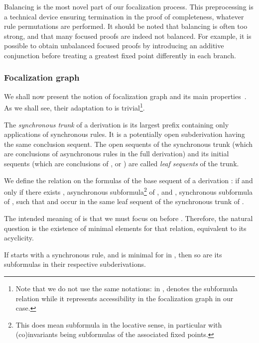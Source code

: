 Balancing is the most novel part of our focalization process.
This preprocessing is a technical device ensuring
termination in the proof of completeness,
whatever rule permutations are performed.
It should be noted that balancing is often too strong,
and that many focused proofs are indeed not balanced.
For example,
it is possible to obtain unbalanced focused proofs
by introducing an additive conjunction before treating a greatest 
fixed point differently in each branch.

\subsubsection{Focalization graph}

We shall now present the notion of focalization graph
and its main properties~\cite{miller07cslb}.
As we shall see, their adaptation to \mumall{}
is trivial\footnote{
  Note that we do not use the same notations:
  in \cite{miller07cslb},  denotes the subformula relation
  while it represents accessibility in the focalization graph in our case.
}.

\begin{definition}
The \emph{synchronous trunk} of a derivation is its largest prefix
containing only applications of synchronous rules.
It is a potentially open subderivation having the same conclusion sequent.
The open sequents of the synchronous trunk (which are conclusions
of asynchronous rules in the full derivation) and its initial sequents
(which are conclusions of ,  or )
are called \emph{leaf sequents} of the trunk.
\end{definition}

\begin{definition}
We define the relation  on the formulas of
the base sequent of a derivation :
 if and only if
there exists , asynchronous subformula\footnote{
  This does mean subformula in the locative sense,
  in particular with (co)invariants being subformulas of
  the associated fixed points.
} of ,
and , synchronous subformula of ,
such that  and  occur in the same
leaf sequent of the synchronous trunk of .
\end{definition}

The intended meaning of  is that we must focus on  before .
Therefore, the natural question is the existence of minimal elements for that 
relation, equivalent to its acyclicity.

\begin{proposition} \label{prop:mini_subform}
If  starts with a synchronous rule,
and  is minimal for  in ,
then so are its subformulas in their respective subderivations.
\end{proposition}


